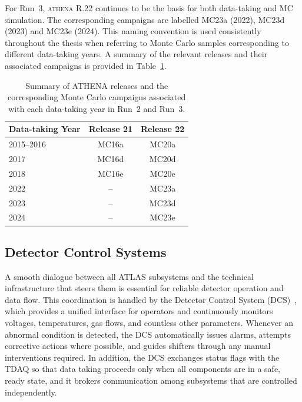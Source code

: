 For Run~3, \textsc{athena} R.22 continues to be the basis for both data-taking and MC simulation. The corresponding campaigns are labelled MC23a (2022), MC23d (2023) and MC23e (2024). This naming convention is used consistently throughout the thesis when referring to Monte Carlo samples corresponding to different data-taking years. A summary of the relevant releases and their associated campaigns is provided in Table~\ref{tab:athena_mc_campaigns}.

\begin{table}[htbp]
    \centering
    \small
    \renewcommand{\arraystretch}{1.3} %
    \setlength{\tabcolsep}{12pt}      %
    \caption{Summary of ATHENA releases and the corresponding Monte Carlo campaigns associated with each data-taking year in Run~2 and Run~3.}
    \label{tab:athena_mc_campaigns}
    \begin{tabular}{lcc}
        \hline
        \textbf{Data-taking Year} & \textbf{Release 21} & \textbf{Release 22} \\
        \hline
        2015--2016 & MC16a & MC20a \\
        2017       & MC16d & MC20d \\
        2018       & MC16e & MC20e \\
        \hline
        2022       & --    & MC23a \\
        2023       & --    & MC23d \\
        2024       & --    & MC23e \\
        \hline
    \end{tabular}
\end{table}



\subsection{Detector Control Systems}
\label{sec:dcs}
A smooth dialogue between all ATLAS subsystems and the technical infrastructure that steers them is essential for reliable detector operation and data flow. This coordination is handled by the Detector Control System (DCS)~\cite{atlas_DCS}, which provides a unified interface for operators and continuously monitors voltages, temperatures, gas flows, and countless other parameters. Whenever an abnormal condition is detected, the DCS automatically issues alarms, attempts corrective actions where possible, and guides shifters through any manual interventions required. In addition, the DCS exchanges status flags with the TDAQ so that data taking proceeds only when all components are in a safe, ready state, and it brokers communication among subsystems that are controlled independently.


